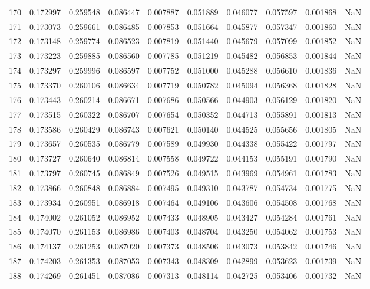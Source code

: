 \begin{tabular}{lrrrrrrrrr}
170 & 0.172997 & 0.259548 & 0.086447 & 0.007887 & 0.051889 & 0.046077 & 0.057597 & 0.001868 & NaN \\
171 & 0.173073 & 0.259661 & 0.086485 & 0.007853 & 0.051664 & 0.045877 & 0.057347 & 0.001860 & NaN \\
172 & 0.173148 & 0.259774 & 0.086523 & 0.007819 & 0.051440 & 0.045679 & 0.057099 & 0.001852 & NaN \\
173 & 0.173223 & 0.259885 & 0.086560 & 0.007785 & 0.051219 & 0.045482 & 0.056853 & 0.001844 & NaN \\
174 & 0.173297 & 0.259996 & 0.086597 & 0.007752 & 0.051000 & 0.045288 & 0.056610 & 0.001836 & NaN \\
175 & 0.173370 & 0.260106 & 0.086634 & 0.007719 & 0.050782 & 0.045094 & 0.056368 & 0.001828 & NaN \\
176 & 0.173443 & 0.260214 & 0.086671 & 0.007686 & 0.050566 & 0.044903 & 0.056129 & 0.001820 & NaN \\
177 & 0.173515 & 0.260322 & 0.086707 & 0.007654 & 0.050352 & 0.044713 & 0.055891 & 0.001813 & NaN \\
178 & 0.173586 & 0.260429 & 0.086743 & 0.007621 & 0.050140 & 0.044525 & 0.055656 & 0.001805 & NaN \\
179 & 0.173657 & 0.260535 & 0.086779 & 0.007589 & 0.049930 & 0.044338 & 0.055422 & 0.001797 & NaN \\
180 & 0.173727 & 0.260640 & 0.086814 & 0.007558 & 0.049722 & 0.044153 & 0.055191 & 0.001790 & NaN \\
181 & 0.173797 & 0.260745 & 0.086849 & 0.007526 & 0.049515 & 0.043969 & 0.054961 & 0.001783 & NaN \\
182 & 0.173866 & 0.260848 & 0.086884 & 0.007495 & 0.049310 & 0.043787 & 0.054734 & 0.001775 & NaN \\
183 & 0.173934 & 0.260951 & 0.086918 & 0.007464 & 0.049106 & 0.043606 & 0.054508 & 0.001768 & NaN \\
184 & 0.174002 & 0.261052 & 0.086952 & 0.007433 & 0.048905 & 0.043427 & 0.054284 & 0.001761 & NaN \\
185 & 0.174070 & 0.261153 & 0.086986 & 0.007403 & 0.048704 & 0.043250 & 0.054062 & 0.001753 & NaN \\
186 & 0.174137 & 0.261253 & 0.087020 & 0.007373 & 0.048506 & 0.043073 & 0.053842 & 0.001746 & NaN \\
187 & 0.174203 & 0.261353 & 0.087053 & 0.007343 & 0.048309 & 0.042899 & 0.053623 & 0.001739 & NaN \\
188 & 0.174269 & 0.261451 & 0.087086 & 0.007313 & 0.048114 & 0.042725 & 0.053406 & 0.001732 & NaN \\

\end{tabular}
